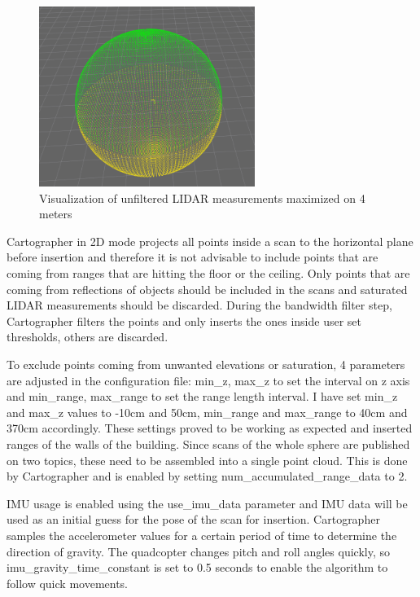 \begin{figure}[!h]
    \centering
	\includegraphics[width=70mm, keepaspectratio]{figures/01_maxed_lidar.png}
    \caption{Visualization of unfiltered LIDAR measurements maximized on 4 meters}
    \label{fig:01_maxed_lidar}
\end{figure}

Cartographer in 2D mode projects all points inside a scan to the horizontal plane before 
insertion and therefore it is not advisable to include points that are coming from ranges 
that are hitting the floor or the ceiling. Only points that are coming from reflections 
of objects should be included in the scans and saturated LIDAR measurements should be 
discarded. During the bandwidth filter step, Cartographer filters the points and only 
inserts the ones inside user set thresholds, others are discarded.

To exclude points coming from unwanted elevations or saturation, 4 parameters are 
adjusted in the configuration file: min\_z, max\_z to set the interval on z axis
and min\_range, max\_range to set the range length interval. I have set min\_z and 
max\_z values to -10cm and 50cm, min\_range and max\_range to 40cm and 370cm accordingly. 
These settings proved to be working as expected and inserted ranges of the walls of 
the building. Since scans of the whole sphere are published on two topics, these need to be 
assembled into a single point cloud. This is done by Cartographer and is enabled by
setting num\_accumulated\_range\_data to 2.

IMU usage is enabled using the use\_imu\_data parameter and IMU data will be used as an 
initial guess for the pose of the scan for insertion. Cartographer samples the 
accelerometer values for a certain period of time to determine the direction of gravity.
The quadcopter changes pitch and roll angles quickly, so imu\_gravity\_time\_constant is 
set to 0.5 seconds to enable the algorithm to follow quick movements.

